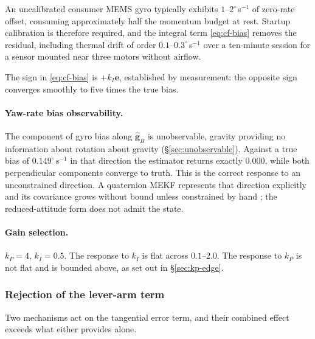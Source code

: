 An uncalibrated consumer MEMS gyro typically exhibits
$1$--$2^\circ$\,s$^{-1}$ of zero-rate offset, consuming approximately half
the momentum budget at rest. Startup calibration is therefore required, and
the integral term \eqref{eq:cf-bias} removes the residual, including thermal
drift of order $0.1$--$0.3^\circ$\,s$^{-1}$ over a ten-minute session for a
sensor mounted near three motors without airflow.

The sign in \eqref{eq:cf-bias} is $+k_I\bm{e}$, established by measurement:
the opposite sign converges smoothly to five times the true bias.

\paragraph{Yaw-rate bias observability.} The component of gyro bias along
$\hat{\bm{g}}_B$ is unobservable, gravity providing no information about
rotation about gravity (\S\ref{sec:unobservable}). Against a true bias of
$0.149^\circ$\,s$^{-1}$ in that direction the estimator returns exactly
$0.000$, while both perpendicular components converge to truth. This is the
correct response to an unconstrained direction. A quaternion MEKF represents
that direction explicitly and its covariance grows without bound unless
constrained by hand \cite{markley2003attitude}; the reduced-attitude form
does not admit the state.

\paragraph{Gain selection.} $k_P = 4$, $k_I = 0.5$. The response to $k_I$ is
flat across $0.1$--$2.0$. The response to $k_P$ is not flat and is bounded
above, as set out in \S\ref{sec:kp-edge}.


\subsubsection{Rejection of the lever-arm term}
\label{sec:cancellation}

Two mechanisms act on the tangential error term, and their combined effect
exceeds what either provides alone.

